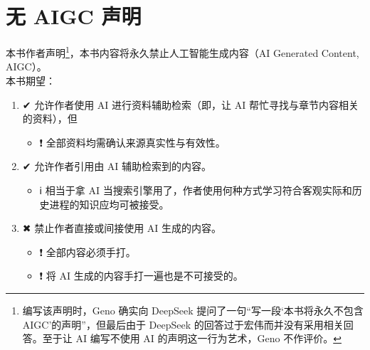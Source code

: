 {}
\chapter*{无 AIGC 声明}\label{ch:Preface/NoAIGC}
    本书作者声明\footnote{编写该声明时，Geno 确实向 DeepSeek 提问了一句“写一段‘本书将永久不包含 AIGC’的声明”，但最后由于 DeepSeek 的回答过于宏伟而并没有采用相关回答。至于让 AI 编写不使用 AI 的声明这一行为艺术，Geno 不作评价。}，本书内容将永久禁止人工智能生成内容（AI Generated Content, AIGC）。\\

    本书期望：
    \begin{enumerate}
        \item ✔ 允许作者使用 AI 进行资料辅助检索（即，让 AI 帮忙寻找与章节内容相关的资料），但
        \begin {itemize}
            \item ❗ 全部资料均需确认来源真实性与有效性。
        \end{itemize}
        \item ✔ 允许作者引用由 AI 辅助检索到的内容。
        \begin {itemize}
            \item ℹ️ 相当于拿 AI 当搜索引擎用了，作者使用何种方式学习符合客观实际和历史进程的知识应均可被接受。
        \end{itemize}
        \item ✖ 禁止作者直接或间接使用 AI 生成的内容。
        \begin {itemize}
            \item ❗ 全部内容必须手打。
            \item ❗ 将 AI 生成的内容手打一遍也是不可接受的。
        \end{itemize}
    \end{enumerate}
